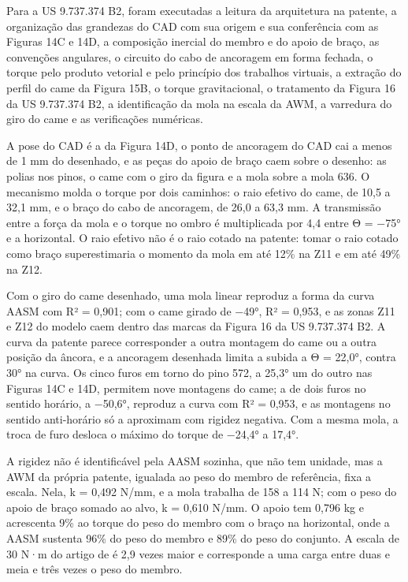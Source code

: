 Para a US 9.737.374 B2, foram executadas a leitura da arquitetura na patente, a organização das grandezas do CAD com sua origem e sua conferência com as Figuras 14C e 14D, a composição inercial do membro e do apoio de braço, as convenções angulares, o circuito do cabo de ancoragem em forma fechada, o torque pelo produto vetorial e pelo princípio dos trabalhos virtuais, a extração do perfil do came da Figura 15B, o torque gravitacional, o tratamento da Figura 16 da US 9.737.374 B2, a identificação da mola na escala da AWM, a varredura do giro do came e as verificações numéricas.

A pose do CAD é a da Figura 14D, o ponto de ancoragem do CAD cai a menos de 1 mm do desenhado, e as peças do apoio de braço caem sobre o desenho: as polias nos pinos, o came com o giro da figura e a mola sobre a mola 636. O mecanismo molda o torque por dois caminhos: o raio efetivo do came, de 10,5 a 32,1 mm, e o braço do cabo de ancoragem, de 26,0 a 63,3 mm. A transmissão entre a força da mola e o torque no ombro é multiplicada por 4,4 entre Θ = −75° e a horizontal. O raio efetivo não é o raio cotado na patente: tomar o raio cotado como braço superestimaria o momento da mola em até 12\% na Z11 e em até 49\% na Z12.

Com o giro do came desenhado, uma mola linear reproduz a forma da curva AASM com R² = 0,901; com o came girado de −49°, R² = 0,953, e as zonas Z11 e Z12 do modelo caem dentro das marcas da Figura 16 da US 9.737.374 B2. A curva da patente parece corresponder a outra montagem do came ou a outra posição da âncora, e a ancoragem desenhada limita a subida a Θ = 22,0°, contra 30° na curva. Os cinco furos em torno do pino 572, a 25,3° um do outro nas Figuras 14C e 14D, permitem nove montagens do came; a de dois furos no sentido horário, a −50,6°, reproduz a curva com R² = 0,953, e as montagens no sentido anti-horário só a aproximam com rigidez negativa. Com a mesma mola, a troca de furo desloca o máximo do torque de −24,4° a 17,4°.

A rigidez não é identificável pela AASM sozinha, que não tem unidade, mas a AWM da própria patente, igualada ao peso do membro de referência, fixa a escala. Nela, k = 0,492 N/mm, e a mola trabalha de 158 a 114 N; com o peso do apoio de braço somado ao alvo, k = 0,610 N/mm. O apoio tem 0,796 kg e acrescenta 9\% ao torque do peso do membro com o braço na horizontal, onde a AASM sustenta 96\% do peso do membro e 89\% do peso do conjunto. A escala de 30 N·m do artigo de \textcite{okabe2026} é 2,9 vezes maior e corresponde a uma carga entre duas e meia e três vezes o peso do membro.

